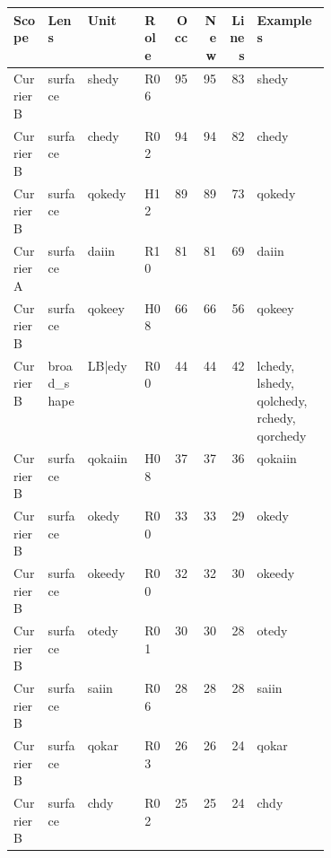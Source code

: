 \begin{tabular}{llp{0.18\linewidth}lrrrp{0.23\linewidth}}
\toprule
Scope & Lens & Unit & Role & Occ & New & Lines & Examples \\
\midrule
Currier B & surface & shedy & R06 & 95 & 95 & 83 & shedy \\
Currier B & surface & chedy & R02 & 94 & 94 & 82 & chedy \\
Currier B & surface & qokedy & H12 & 89 & 89 & 73 & qokedy \\
Currier A & surface & daiin & R10 & 81 & 81 & 69 & daiin \\
Currier B & surface & qokeey & H08 & 66 & 66 & 56 & qokeey \\
Currier B & broad\_shape & LB|edy & R00 & 44 & 44 & 42 & lchedy, lshedy, qolchedy, rchedy, qorchedy \\
Currier B & surface & qokaiin & H08 & 37 & 37 & 36 & qokaiin \\
Currier B & surface & okedy & R00 & 33 & 33 & 29 & okedy \\
Currier B & surface & okeedy & R00 & 32 & 32 & 30 & okeedy \\
Currier B & surface & otedy & R01 & 30 & 30 & 28 & otedy \\
Currier B & surface & saiin & R06 & 28 & 28 & 28 & saiin \\
Currier B & surface & qokar & R03 & 26 & 26 & 24 & qokar \\
Currier B & surface & chdy & R02 & 25 & 25 & 24 & chdy \\
\bottomrule
\end{tabular}
